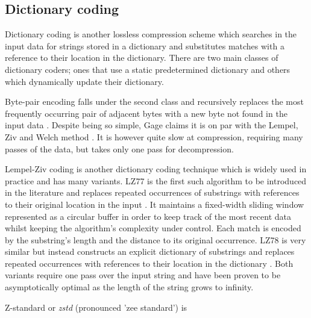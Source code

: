 
\subsection{Dictionary coding}

Dictionary coding is another lossless compression scheme which searches in the input data for strings stored in a dictionary and substitutes matches with a reference to their location in the dictionary. There are two main classes of dictionary coders; ones that use a static predetermined dictionary and others which dynamically update their dictionary.

Byte-pair encoding falls under the second class and recursively replaces the most frequently occurring pair of adjacent bytes with a new byte not found in the input data \cite{byte-pair}. Despite being so simple, Gage claims it is on par with the Lempel, Ziv and Welch method \cite{lzw}. It is however quite slow at compression, requiring many passes of the data, but takes only one pass for decompression.

Lempel-Ziv coding is another dictionary coding technique which is widely used in practice and has many variants. LZ77 is the first such algorithm to be introduced in the literature and replaces repeated occurrences of substrings with references to their original location in the input \cite{lz77}. It maintains a fixed-width sliding window represented as a circular buffer in order to keep track of the most recent data whilst keeping the algorithm's complexity under control. Each match is encoded by the substring's length and the distance to its original occurrence. LZ78 is very similar but instead constructs an explicit dictionary of substrings and replaces repeated occurrences with references to their location in the dictionary \cite{lz78}. Both variants require one pass over the input string and have been proven to be asymptotically optimal as the length of the string grows to infinity.


Z-standard or \textit{zstd} (pronounced 'zee standard') is 

